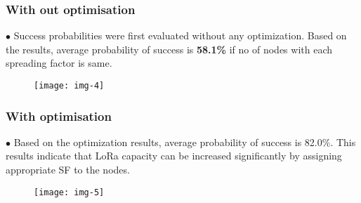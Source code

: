 \documentclass{beamer}
\begin{document}
\begin{frame}
\frametitle{With out optimisation}
$\bullet$ Success probabilities were first evaluated without any optimization. Based on the results, average probability of success
is \textbf{58.1\%} if no of nodes with each spreading factor is same.
\begin{figure}[h]
    \centering
    \texttt{[image: img-4]}
\end{figure}

\end{frame}

\begin{frame}
\frametitle{With optimisation}
$\bullet$ Based on the optimization results, average probability of success is 82.0\%. This results indicate that LoRa capacity can be increased significantly by assigning appropriate SF to the nodes.
\begin{figure}[h]
    \centering
    \texttt{[image: img-5]}
\end{figure}

\end{frame}
\end{document}
